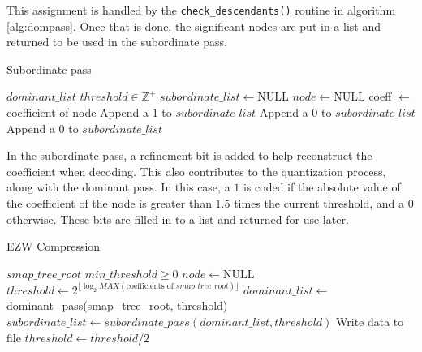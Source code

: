 \documentclass[./A14_Report.tex]{subfiles}
\begin{document}
This assignment is handled by the \texttt{check_descendants()} routine
in algorithm \ref{alg:dompass}. Once that is done, the significant nodes are
put in a list and returned to be used in the subordinate pass.

\begin{algorithm}[H]
    \caption{Subordinate pass}
    \label{alg:subpass}
    \begin{algorithmic}
        \Require $dominant\_list$
        \Require $threshold \in \mathbb{Z}^+$
        \State $subordinate\_list \gets \text{NULL}$
        \State $node \gets \text{NULL}$
            \State coeff $\gets$ coefficient of node
                    \State Append a $1$ to $subordinate\_list$
                \Else
                    \State Append a $0$ to $subordinate\_list$
                \EndIf
            \Else
                \State Append a $0$ to $subordinate\_list$
            \EndIf
        \EndFor
    \end{algorithmic}
\end{algorithm}

In the subordinate pass, a refinement bit is added to help reconstruct the
coefficient when decoding. This also contributes to the quantization process,
along with the dominant pass. In this case, a $1$ is coded if the absolute
value of the coefficient of the node is greater than $1.5$ times the current
threshold, and a $0$ otherwise. These bits are filled in to a list and returned
for use later.

\begin{algorithm}[H]
    \caption{EZW Compression}
    \label{alg:ezw}
    \begin{algorithmic}
        \Require $smap\_tree\_root$ 
        \Require $min\_threshold \ge 0$
        \State $node \gets \text{NULL}$
        \State $threshold \gets 2^{\lfloor\log_2{MAX(\text{coefficients of } smap\_tree\_root)}\rfloor}$
            \State $dominant\_list \gets$ dominant\_pass(smap\_tree\_root, threshold)
            \State $subordinate\_list \gets subordinate\_pass(dominant\_list, threshold)$
            \State Write data to file
            \State $threshold \gets threshold/2$
        \EndWhile
    \end{algorithmic}
\end{algorithm}
\end{document}
